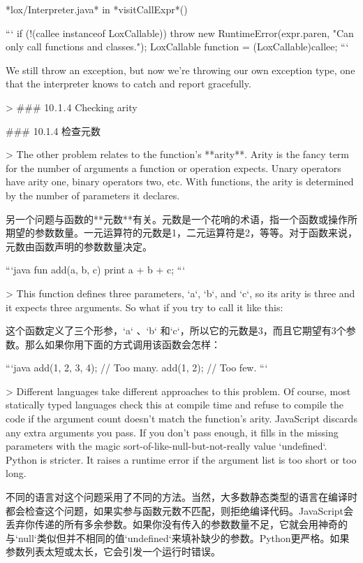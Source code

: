 \documentclass[cn,11pt,chinese]{elegantbook}
\begin{document}
*lox/Interpreter.java*
in *visitCallExpr*()

```
    if (!(callee instanceof LoxCallable)) {
      throw new RuntimeError(expr.paren,
          "Can only call functions and classes.");
    }
    LoxCallable function = (LoxCallable)callee;
```

We still throw an exception, but now we’re throwing our own exception type, one that the interpreter knows to catch and report gracefully.

> ### 10 . 1 . 4 Checking arity

### 10.1.4 检查元数

> The other problem relates to the function’s **arity**. Arity is the fancy term for the number of arguments a function or operation expects. Unary operators have arity one, binary operators two, etc. With functions, the arity is determined by the number of parameters it declares.

另一个问题与函数的**元数**有关。元数是一个花哨的术语，指一个函数或操作所期望的参数数量。一元运算符的元数是1，二元运算符是2，等等。对于函数来说，元数由函数声明的参数数量决定。

```java
fun add(a, b, c) {
  print a + b + c;
}
```

> This function defines three parameters, `a`, `b`, and `c`, so its arity is three and it expects three arguments. So what if you try to call it like this:

这个函数定义了三个形参，`a` 、`b` 和`c`，所以它的元数是3，而且它期望有3个参数。那么如果你用下面的方式调用该函数会怎样：

```java
add(1, 2, 3, 4); // Too many.
add(1, 2);       // Too few.
```

> Different languages take different approaches to this problem. Of course, most statically typed languages check this at compile time and refuse to compile the code if the argument count doesn’t match the function’s arity. JavaScript discards any extra arguments you pass. If you don’t pass enough, it fills in the missing parameters with the magic sort-of-like-null-but-not-really value `undefined`. Python is stricter. It raises a runtime error if the argument list is too short or too long.

不同的语言对这个问题采用了不同的方法。当然，大多数静态类型的语言在编译时都会检查这个问题，如果实参与函数元数不匹配，则拒绝编译代码。JavaScript会丢弃你传递的所有多余参数。如果你没有传入的参数数量不足，它就会用神奇的与`null`类似但并不相同的值`undefined`来填补缺少的参数。Python更严格。如果参数列表太短或太长，它会引发一个运行时错误。
\end{document}
